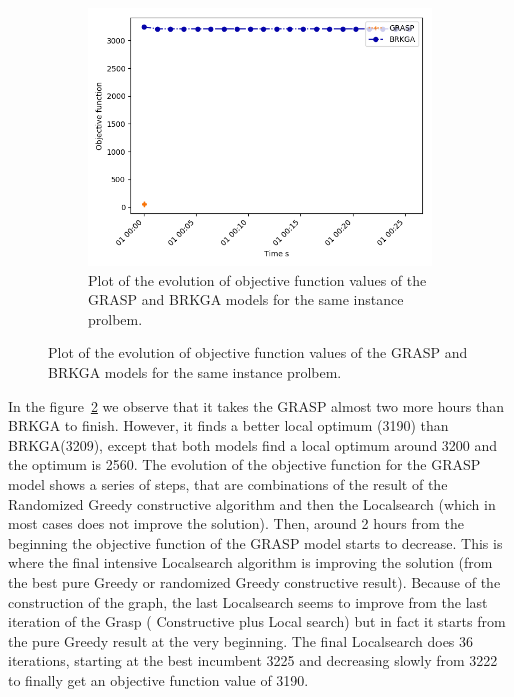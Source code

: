 \begin{figure}[h!]
\centering
\begin{subfigure}[b]{.8\linewidth}
\centering
\includegraphics[width=0.7\linewidth]{./img/metah_comparison_objfunc.png}
\caption{ Plot of the evolution of objective function values of the GRASP and BRKGA models for the same instance prolbem. }\label{fig1a}
\end{subfigure}%
\label{meta_comparison}
\end{figure}


In the figure~\ref{meta_comparison} we observe that it takes the GRASP almost two more hours than BRKGA to finish. However, it finds a better local optimum (3190) than BRKGA(3209), except that both models find a local optimum around 3200 and the optimum is 2560.
The evolution of the objective function for the GRASP model shows a series of steps, that are combinations of the result of the Randomized Greedy constructive algorithm and then the Localsearch (which in most cases does not improve the solution). Then, around 2 hours from the beginning the objective function of the GRASP model starts to decrease. This is where the final intensive Localsearch algorithm is improving the solution (from the best pure Greedy or randomized Greedy constructive result). Because of the construction of the graph, the last Localsearch seems to improve from the last iteration of the Grasp ( Constructive plus Local search) but in fact it starts from the pure Greedy result at the very beginning. The final Localsearch does 36 iterations, starting at the best incumbent 3225 and decreasing slowly from 3222 to finally get an objective function value of 3190.

